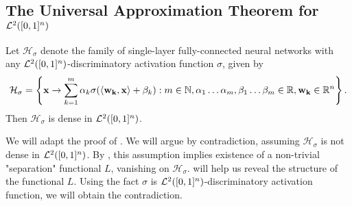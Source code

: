 \subsection{The Universal Approximation Theorem for ${\mathcal {L}^2}([0,1]^n)$}
\label{subsection:universality:ltwo:2}
\begin{theorem}
\label{thm:universality:ltwo:discrim}
Let $\mathcal{H}_{\sigma}$ denote the family of single-layer fully-connected neural networks with any ${\mathcal {L}^2}([0,1]^n)$-discriminatory activation function $\sigma$, given by \begin{align*}
\mathcal{H}_{\sigma} = \left \{ \mathbf{x} \to \sum_{k=1}^{m} \alpha_k \sigma{\left (\langle \mathbf{w_k}, \mathbf{x} \rangle + \beta_k \right)} : m \in {\mathbb N}, \alpha_1 \ldots \alpha_m, \beta_1 \ldots \beta_m \in {\mathbb R}, \mathbf{w_k} \in {\mathbb R}^n \right \}.
\end{align*}
Then $\mathcal{H}_{\sigma}$ is dense in ${\mathcal {L}^2}([0,1]^n)$.
\end{theorem}
\begin{proof-idea*} We will adapt the proof of . We will argue by contradiction, assuming $\mathcal{H}_{\sigma}$ is not dense in ${\mathcal {L}^2}([0,1]^n)$. By ,
this assumption implies existence of a non-trivial "separation" functional $L$, vanishing on  $\mathcal{H}_{\sigma}$.   will help us reveal the structure of the functional $L$. Using the fact $\sigma$ is ${\mathcal {L}^2}([0,1]^n)$-discriminatory activation function, we will obtain the contradiction.
\end{proof-idea*}
